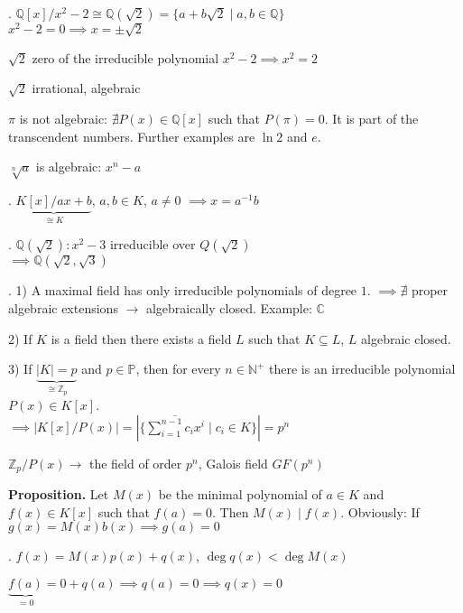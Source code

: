 \Example.
$\mathbb{Q}[x] / x^2 -2 \cong \mathbb{Q}(\sqrt{2}) = \{ a+b \sqrt{2} \mid a,b \in \mathbb{Q}\}$ \\
$x^2-2 = 0 \implies x = \pm \sqrt{2}$

$\sqrt{2}$ zero of the irreducible polynomial $x^2 -2 \implies x^2 = 2$

$\sqrt{2}$ irrational, algebraic

$\pi$ is not algebraic: $\nexists P(x) \in \mathbb{Q}[x]$ such that $P(\pi) = 0$. It is part of the transcendent numbers. Further examples are $\ln 2$ and $e$.

$\sqrt[n]{a}$ is algebraic: $x^n-a$

\Example.
$\underbrace{K[x]/ax+b}_{\cong K}$, $a,b \in K$, $ a\neq 0$ $\implies x = a^{-1}b$

\Example.
$\mathbb{Q}(\sqrt{2}): x^2 -3$ irreducible over $Q(\sqrt{2})$\\
$\implies \mathbb{Q}(\sqrt{2}, \sqrt{3})$

\Remark.
1) A maximal field has only irreducible polynomials of degree $1$. $\implies \nexists$ proper algebraic extensions $\rightarrow$ algebraically closed. Example: $\mathbb{C}$

2) If $K$ is a field then there exists a field $L$ such that $K \subseteq L$, $L$ algebraic closed.

3) If $\underbrace{|K| = p}_{\cong \mathbb{Z}_p}$ and $p\in \mathbb{P}$, then for every $n \in \mathbb{N}^{+}$ there is an irreducible polynomial $P(x) \in K[x]$. \\
$\implies \left| K[x]/P(x) \right| = \left| \{\overline{\sum_{i=1}^{n-1} c_i x^i} \mid c_i \in K\} \right| = p^n$

$\mathbb{Z}_p/P(x) \rightarrow$ the field of order $p^n$, Galois field $GF(p^n)$

\textbf{Proposition.}
Let $M(x)$ be the minimal polynomial of $a \in K$ and $f(x) \in K[x]$ such that $f(a) = 0$. Then $M(x)∣f(x)$. Obviously: If $g(x) = M(x)b(x) \implies g(a) = 0$

\Proof.
$f(x) = M(x) p(x) + q(x)$, $\deg q(x) < \deg M(x)$

$\underbrace{f(a)}_{=0} = 0 + q(a) \implies q(a) = 0 \implies q(x) = 0$
